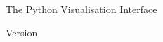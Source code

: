 
\begin{titlepage}

{\Huge \pyvisi}

\vspace{20mm}

\centerline{\Large The Python Visualisation Interface}

\vspace{10mm}

\centerline{\Large Version \pyvisiVersion}

\vspace{30mm}


\rightline{\today}

\end{titlepage}

